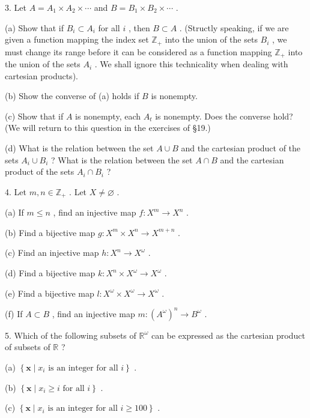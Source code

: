 3. Let \(A = {A}_{1} \times  {A}_{2} \times  \cdots\) and \(B = {B}_{1} \times  {B}_{2} \times  \cdots\) .

(a) Show that if \({B}_{i} \subset  {A}_{i}\) for all \(i\) , then \(B \subset  A\) . (Structly speaking, if we are given a function mapping the index set \({\mathbb{Z}}_{ + }\) into the union of the sets \({B}_{i}\) , we must change its range before it can be considered as a function mapping \({\mathbb{Z}}_{ + }\) into the union of the sets \({A}_{i}\) . We shall ignore this technicality when dealing with cartesian products).

(b) Show the converse of (a) holds if \(B\) is nonempty.

(c) Show that if \(A\) is nonempty, each \({A}_{t}\) is nonempty. Does the converse hold? (We will return to this question in the exercises of §19.)

(d) What is the relation between the set \(A \cup  B\) and the cartesian product of the sets \({A}_{i} \cup  {B}_{i}\) ? What is the relation between the set \(A \cap  B\) and the cartesian product of the sets \({A}_{i} \cap  {B}_{i}\) ?

4. Let \(m,n \in  {\mathbb{Z}}_{ + }\) . Let \(X \neq  \varnothing\) .

(a) If \(m \leq  n\) , find an injective map \(f : {X}^{m} \rightarrow  {X}^{n}\) .

(b) Find a bijective map \(g : {X}^{m} \times  {X}^{n} \rightarrow  {X}^{m + n}\) .

(c) Find an injective map \(h : {X}^{n} \rightarrow  {X}^{\omega }\) .

(d) Find a bijective map \(k : {X}^{n} \times  {X}^{\omega } \rightarrow  {X}^{\omega }\) .

(e) Find a bijective map \(l : {X}^{\omega } \times  {X}^{\omega } \rightarrow  {X}^{\omega }\) .

(f) If \(A \subset  B\) , find an injective map \(m : {\left( {A}^{\omega }\right) }^{n} \rightarrow  {B}^{\omega }\) .

5. Which of the following subsets of \({\mathbb{R}}^{\omega }\) can be expressed as the cartesian product of subsets of \(\mathbb{R}\) ?

(a) \(\left\{  {\mathbf{x} \mid  {x}_{i}\text{ is an integer for all }i}\right\}\) .

(b) \(\left\{  {\mathbf{x} \mid  {x}_{i} \geq  i\text{ for all }i}\right\}\) .

(c) \(\left\{  {\mathbf{x} \mid  {x}_{i}\text{ is an integer for all }i \geq  {100}}\right\}\) .

